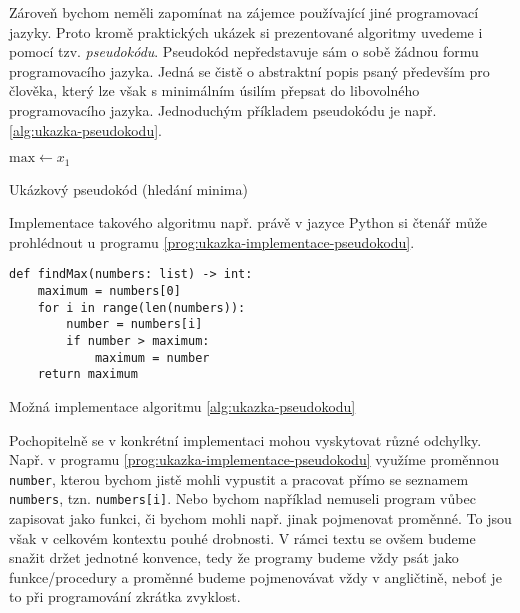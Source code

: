 Zároveň bychom neměli zapomínat na zájemce používající jiné programovací jazyky. Proto kromě praktických ukázek si prezentované algoritmy uvedeme i pomocí tzv. \emph{pseudokódu}. Pseudokód nepředstavuje sám o sobě žádnou formu programovacího jazyka. Jedná se čistě o abstraktní popis psaný především pro člověka, který lze však s minimálním úsilím přepsat do libovolného programovacího jazyka. Jednoduchým příkladem pseudokódu je např. \ref{alg:ukazka-pseudokodu}.
\begin{algorithm}
    $\text{max}\gets x_1$\\
    \caption{Ukázkový pseudokód (hledání minima)}
    \label{alg:ukazka-pseudokodu}
\end{algorithm}
Implementace takového algoritmu např. právě v jazyce Python si čtenář může prohlédnout u programu \ref{prog:ukazka-implementace-pseudokodu}.
\begin{program}[h]
    \begin{lstlisting}[style=python]
def findMax(numbers: list) -> int:
    maximum = numbers[0]
    for i in range(len(numbers)):
        number = numbers[i]
        if number > maximum:
            maximum = number
    return maximum
    \end{lstlisting}
    \caption{Možná implementace algoritmu \ref{alg:ukazka-pseudokodu}}
    \label{prog:ukazka-implementace-pseudokodu}
\end{program}
Pochopitelně se v konkrétní implementaci mohou vyskytovat různé odchylky. Např. v programu \ref{prog:ukazka-implementace-pseudokodu} využíme proměnnou \texttt{number}, kterou bychom jistě mohli vypustit a pracovat přímo se seznamem \texttt{numbers}, tzn. \texttt{numbers[i]}. Nebo bychom například nemuseli program vůbec zapisovat jako funkci, či bychom mohli např. jinak pojmenovat proměnné. To jsou však v celkovém kontextu pouhé drobnosti. V rámci textu se ovšem budeme snažit držet jednotné konvence, tedy že programy budeme vždy psát jako funkce/procedury a proměnné budeme pojmenovávat vždy v angličtině, neboť je to při programování zkrátka zvyklost.